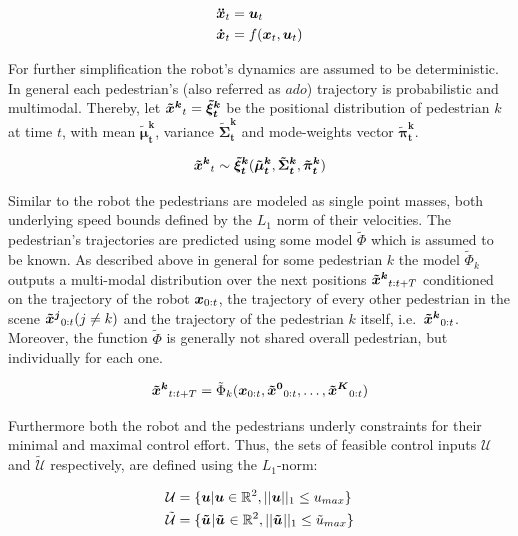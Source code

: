 \begin{align}
\boldsymbol{\ddot{x}}_t &= \boldsymbol{u}_t \\
\boldsymbol{\dot{x}}_t &= f(\boldsymbol{x}_t, \boldsymbol{u}_t)
\label{eq:robot_dynamics}
\end{align}

For further simplification the robot's dynamics are assumed to be deterministic.
\newline
In general each pedestrian's (also referred as $ado$) trajectory is probabilistic and multimodal. Thereby,  let $\xped[k]_t = \boldsymbol{\tilde{\xi}_t^k}$ be the positional distribution of pedestrian $k$ at time $t$, with mean $\boldsymbol{\tilde{\mu}_t^k}$, variance $\boldsymbol{\tilde{\Sigma}_t^k}$ and mode-weights vector $\boldsymbol{\tilde{\pi}_t^k}$. 

\begin{equation}
\xped[k]_t \sim \boldsymbol{\tilde{\xi}_t^k}(\boldsymbol{\tilde{\mu}_t^k}, \boldsymbol{\tilde{\Sigma}_t^k}, \boldsymbol{\tilde{\pi}_t^k})    
\end{equation}

Similar to the robot the pedestrians are modeled as single point masses, both underlying speed bounds defined by the $L_1$ norm of their velocities. 
\newline
The pedestrian's trajectories are predicted using some model $\tilde{\Phi}$ which is assumed to be known. As described above in general for some pedestrian $k$ the model $\tilde{\Phi}_k$ outputs a multi-modal distribution over the next positions $\xped[k]_{t:t+T}$ conditioned on the trajectory of the robot $\boldsymbol{x}_{0:t}$, the trajectory of every other pedestrian in the scene $\xped[j]_{0:t} (j \neq k)$ and the trajectory of the pedestrian $k$ itself, i.e.\ $\xped[k]_{0:t}$. Moreover, the function $\tilde{\Phi}$ is generally not shared overall pedestrian, but individually for each one.

\begin{equation}
\xped[k]_{t:t+T} = \tilde{\Phi}_k(\x_{0:t}, \xped[0]_{0:t}, \hdots, \xped[K]_{0:t})\end{equation}

Furthermore both the robot and the pedestrians underly constraints for their minimal and maximal control effort. Thus, the sets of feasible control inputs $
\mathcal{U}$ and $\mathcal{\tilde{U}}$ respectively, are defined using the $L_1$-norm:

\begin{align}
\mathcal{U} &= \{\u | \u \in \mathbb{R}^2, ||\u||_1 \leq u_{max}\} \\
\mathcal{\tilde{U}} &= \{\uped[] | \uped[] \in \mathbb{R}^2, ||\uped[]||_1 \leq \tilde{u}_{max}\} 
\label{eq:controls_bounds}
\end{align}
 
